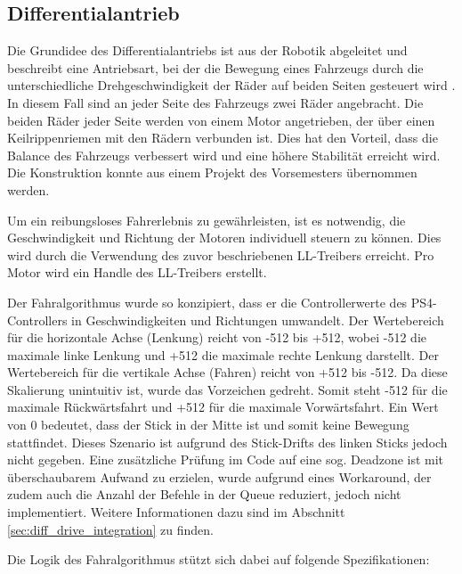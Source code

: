 \subsection{Differentialantrieb}

Die Grundidee des Differentialantriebs ist aus der Robotik abgeleitet und beschreibt eine Antriebsart, bei der die Bewegung eines Fahrzeugs durch die unterschiedliche Drehgeschwindigkeit der Räder auf beiden Seiten gesteuert wird \cite{design_and_control_for_differential_drive_mobile_robot}. In diesem Fall sind an jeder Seite des Fahrzeugs zwei Räder angebracht. Die beiden Räder jeder Seite werden von einem Motor angetrieben, der über einen Keilrippenriemen mit den Rädern verbunden ist. Dies hat den Vorteil, dass die Balance des Fahrzeugs verbessert wird und eine höhere Stabilität erreicht wird. Die Konstruktion konnte aus einem Projekt des Vorsemesters übernommen werden. \newline

Um ein reibungsloses Fahrerlebnis zu gewährleisten, ist es notwendig, die Geschwindigkeit und Richtung der Motoren individuell steuern zu können. Dies wird durch die Verwendung des zuvor beschriebenen LL-Treibers erreicht. Pro Motor wird ein Handle des LL-Treibers erstellt. \newline

Der Fahralgorithmus wurde so konzipiert, dass er die Controllerwerte des PS4-Controllers in Geschwindigkeiten und Richtungen umwandelt. Der Wertebereich für die horizontale Achse (Lenkung) reicht von -512 bis +512, wobei -512 die maximale linke Lenkung und +512 die maximale rechte Lenkung darstellt. Der Wertebereich für die vertikale Achse (Fahren) reicht von +512 bis -512. Da diese Skalierung unintuitiv ist, wurde das Vorzeichen gedreht. Somit steht -512 für die maximale Rückwärtsfahrt und +512 für die maximale Vorwärtsfahrt. Ein Wert von 0 bedeutet, dass der Stick in der Mitte ist und somit keine Bewegung stattfindet. Dieses Szenario ist aufgrund des Stick-Drifts des linken Sticks jedoch nicht gegeben. Eine zusätzliche Prüfung im Code auf eine sog. Deadzone ist mit überschaubarem Aufwand zu erzielen, wurde aufgrund eines Workaround, der zudem auch die Anzahl der Befehle in der Queue reduziert, jedoch nicht implementiert. Weitere Informationen dazu sind im Abschnitt \ref{sec:diff_drive_integration} zu finden. \newline

Die Logik des Fahralgorithmus stützt sich dabei auf folgende Spezifikationen:

